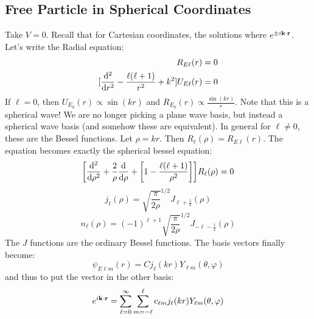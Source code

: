 \subsection{Free Particle in Spherical Coordinates}
Take $V = 0$. Recall that for Cartesian coordinates, the solutions where $e^{\pm i \mathbf{k} \cdot \mathbf{r}}$. Let's
write the Radial equation:
\begin{align*}
    [\dv{^2}{r^2} + \frac{2}{r} \dv{}{r} - \frac{\ell(\ell + 1)}{r^2} + k^2] R_{E\ell}(r) &= 0 \\
    [\dv{^2}{r^2} - \frac{\ell(\ell + 1)}{r^2} + k^2] U_{E\ell}(r) &= 0 \\
\end{align*}
If $\ell = 0$, then $U_{E_0}(r) \propto \sin(k r)$ and $R_{E_0}(r) \propto \frac{\sin(kr)}{r}$. Note that this 
is a spherical wave! We are no longer picking a plane wave basis, but instead a spherical wave basis (and somehow these are equivalent).
In general for $\ell \neq 0$, these are the Bessel functions. Let $\rho = kr$. Then $R_{\ell}(\rho) = R_{E\ell}(r)$.
The equation becomes exactly the spherical bessel equation:
\[ \qty[\dv{^2}{\rho^2} + \frac{2}{\rho} \dv{}{\rho} + \qty[1 - \frac{\ell(\ell + 1)}{\rho^2}]] R_{\ell}(\rho) = 0 \]
\[ j_{\ell}(\rho) = \sqrt{\frac{\pi}{2\rho}}^{1/2} J_{\ell + \frac{1}{2}}(\rho) \]
\[ n_{\ell}(\rho) = (-1)^{\ell + 1} \sqrt{\frac{\pi}{2\rho}}^{1/2} J_{-\ell- \frac{1}{2}}(\rho) \]
The $J$ functions are the ordinary Bessel functions. The basis vectors finally become:
\[ \psi_{E \ell m} (r) = C j_{\ell}(kr) Y_{\ell m} (\theta, \varphi) \]
and thus to put the vector in the other basis:
\[ e^{i \mathbf{k} \cdot \mathbf{r}} = \sum_{\ell = 0}^{\infty} \sum_{m = -\ell}^{\ell} c_{\ell m} j_{\ell}(k r) Y_{\ell m}(\theta, \varphi) \]
